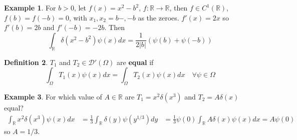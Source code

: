 \documentclass[12pt,a4paper]{article}
\theoremstyle{definition}
\newtheorem{definition}{Definition}[subsection]
\newtheorem{example}[definition]{Example}
\begin{document}
\begin{example}
	For $b > 0$, let $f(x) = x^2 - b^2$, $f: \mathbb{R} \rightarrow \mathbb{R}$, then $f \in C^1(\mathbb{R})$, $f(b) = f(-b) = 0$, with $x_1, x_2 = b-, -b$ as the zeroes. $f'(x) = 2x$ so $f'(b) = 2b$ and $f'(-b) = -2b$. Then
	\[
		\int_{\mathbb{R}} \delta(x^2 - b^2) \psi(x) dx = \frac{1}{2|b|} (\psi(b) + \psi(-b))
	\]
\end{example}

\begin{definition}
	$T_1$ and $T_2 \in \mathcal{D}'(\Omega)$ are \textbf{equal} if
	\[
		\int_{\Omega} T_1(x) \psi(x) dx = \int_{\Omega} T_2(x) \psi(x) dx \quad \forall \psi \in \mathcal{\Omega}
	\]
\end{definition}

\begin{example}
	For which value of $A \in \mathbb{R}$ are $T_1 = x^2 \delta(x^3)$ and $T_2 = A \delta(x)$ equal?
	\[
		\begin{aligned}
			\int_{\mathbb{R}} x^2 \delta(x^3) \psi(x) dx & = \frac{1}{3} \int_{\mathbb{R}} \delta(y) \psi(y^{1/3}) dy & = \frac{1}{3} \psi(0)
			\int_{\mathbb{R}} A \delta(x) \psi(x) dx = A \psi(0)
		\end{aligned}
	\]
	so $A = 1/3$.
\end{example}
\end{document}
